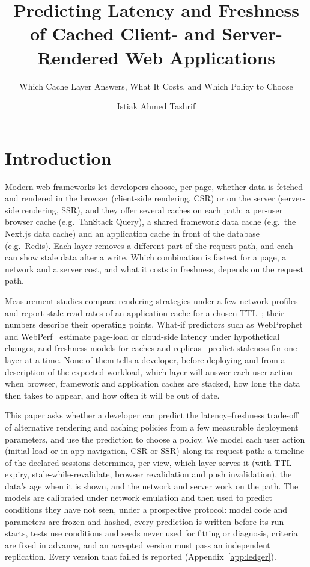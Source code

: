 \documentclass[acmsmall,review,nonacm]{acmart}
\title{Predicting Latency and Freshness of Cached Client- and Server-Rendered Web Applications}
\subtitle{Which Cache Layer Answers, What It Costs, and Which Policy to Choose}
\author{Istiak Ahmed Tashrif}
\affiliation{%
  \department{Department of Computer Science and Engineering}
  \institution{Sonargaon University}
  \city{Dhaka}
  \country{Bangladesh}}
\begin{document}
\maketitle

\section{Introduction}

Modern web frameworks let developers choose, per page, whether data is fetched and rendered in the browser (client-side rendering, CSR) or on the server (server-side rendering, SSR), and they offer several caches on each path: a per-user browser cache (e.g.\ TanStack Query), a shared framework data cache (e.g.\ the Next.js data cache) and an application cache in front of the database (e.g.\ Redis).
Each layer removes a different part of the request path, and each can show stale data after a write.
Which combination is fastest for a page, a network and a server cost, and what it costs in freshness, depends on the request path.

Measurement studies compare rendering strategies under a few network profiles~\cite{pati2025nextjs} and report stale-read rates of an application cache for a chosen TTL~\cite{ji2023transparent}; their numbers describe their operating points.
What-if predictors such as WebProphet~\cite{li2010webprophet} and WebPerf~\cite{jiang2016webperf} estimate page-load or cloud-side latency under hypothetical changes, and freshness models for caches and replicas~\cite{cho2000freshness,gessert2017quaestor,bailis2012pbs} predict staleness for one layer at a time.
None of them tells a developer, before deploying and from a description of the expected workload, which layer will answer each user action when browser, framework and application caches are stacked, how long the data then takes to appear, and how often it will be out of date.

This paper asks whether a developer can predict the latency--freshness trade-off of alternative rendering and caching policies from a few measurable deployment parameters, and use the prediction to choose a policy.
We model each user action (initial load or in-app navigation, CSR or SSR) along its request path: a timeline of the declared sessions determines, per view, which layer serves it (with TTL expiry, stale-while-revalidate, browser revalidation and push invalidation), the data's age when it is shown, and the network and server work on the path.
The models are calibrated under network emulation and then used to predict conditions they have not seen, under a prospective protocol: model code and parameters are frozen and hashed, every prediction is written before its run starts, tests use conditions and seeds never used for fitting or diagnosis, criteria are fixed in advance, and an accepted version must pass an independent replication.
Every version that failed is reported (Appendix~\ref{app:ledger}).
\end{document}
